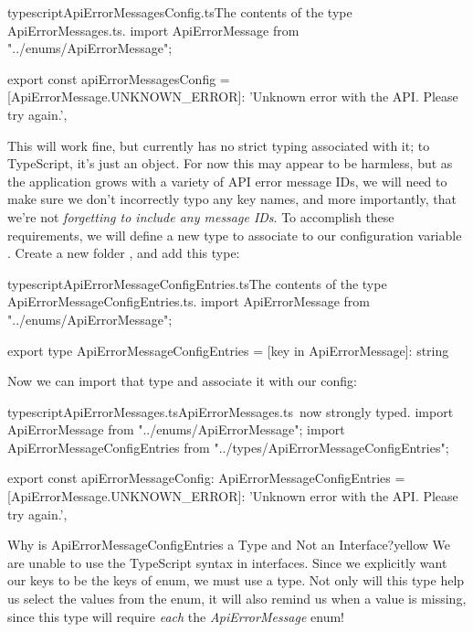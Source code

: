 \documentclass[a4paper,headinclude=on,footinclude=on,12pt,oneside]{scrbook}
\begin{document}
\begin{codeInput}{typescript}{ApiErrorMessagesConfig.ts}{The contents of the type ApiErrorMessages.ts.}
import ApiErrorMessage from "../enums/ApiErrorMessage";

export const apiErrorMessagesConfig = {
    [ApiErrorMessage.UNKNOWN_ERROR]: 'Unknown error with the API. Please try again.',
}
\end{codeInput}

This will work fine, but  currently has no strict typing associated with it; to TypeScript, it's just an object. For now this may appear to be harmless, but as the application grows with a variety of API error message IDs, we will need to make sure we don't incorrectly typo any key names, and more importantly, that we're not \textit{forgetting to include any message IDs}. To accomplish these requirements, we will define a new type to associate to our configuration variable . Create a new folder , and add this type:

\begin{codeInput}{typescript}{ApiErrorMessageConfigEntries.ts}{The contents of the type ApiErrorMessageConfigEntries.ts.}
import ApiErrorMessage from "../enums/ApiErrorMessage";

export type ApiErrorMessageConfigEntries = {
    [key in ApiErrorMessage]: string
}
\end{codeInput}

Now we can import that type and associate it with our config:

\begin{codeInput}{typescript}{ApiErrorMessages.ts}{ApiErrorMessages.ts\, now strongly typed.}
import ApiErrorMessage from "../enums/ApiErrorMessage";
import { ApiErrorMessageConfigEntries } from "../types/ApiErrorMessageConfigEntries";

export const apiErrorMessageConfig: ApiErrorMessageConfigEntries = {
    [ApiErrorMessage.UNKNOWN_ERROR]: 'Unknown error with the API. Please try again.',
}
\end{codeInput}

\begin{highlightBox}{Why is ApiErrorMessageConfigEntries a Type and Not an Interface?}{yellow}{\warning}
We are unable to use the TypeScript  syntax in interfaces. Since we explicitly want our keys to be the keys of  enum, we must use a type. Not only will this type help us select the values from the  enum, it will also remind us when a value is missing, since this type will require \textit{each}  the \textit{ApiErrorMessage} enum!
\end{highlightBox}
\end{document}
